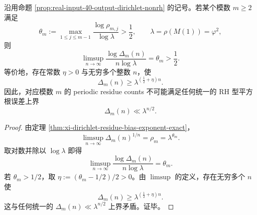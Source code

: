 \begin{corollary}\label{cor:xi-dirichlet-residue-rh-failure-strict-exponential}
沿用命题 \ref{prop:real-input-40-output-dirichlet-nonrh} 的记号。若某个模数 \(m\ge 2\) 满足
\[
\theta_m:=\max_{1\le j\le m-1}\frac{\log\rho_{m,j}}{\log\lambda}>\frac12,
\qquad
\lambda=\rho(M(1))=\varphi^2,
\]
则
\[
\limsup_{n\to\infty}\frac{\log \Delta_m(n)}{n\log\lambda}
=
\theta_m
>
\frac12.
\]
等价地，存在常数 \(\eta>0\) 与无穷多个整数 \(n\)，使
\[
\Delta_m(n)\ge \lambda^{(\frac12+\eta)n}.
\]
因此，对应模数 \(m\) 的 periodic residue counts 不可能满足任何统一的 RH 型平方根误差上界
\[
\Delta_m(n)\ll \lambda^{n/2}.
\]
\end{corollary}
\begin{proof}
由定理 \ref{thm:xi-dirichlet-residue-bias-exponent-exact}，
\[
\limsup_{n\to\infty}\Delta_m(n)^{1/n}
=
\rho_m
=
\lambda^{\theta_m}.
\]
取对数并除以 \(\log\lambda\) 即得
\[
\limsup_{n\to\infty}\frac{\log \Delta_m(n)}{n\log\lambda}
=
\theta_m.
\]
若 \(\theta_m>1/2\)，取 \(\eta:=(\theta_m-1/2)/2>0\)。由 \(\limsup\) 的定义，存在无穷多个 \(n\) 使
\[
\Delta_m(n)\ge \lambda^{(\frac12+\eta)n}.
\]
这与任何统一的 \(\Delta_m(n)\ll \lambda^{n/2}\) 上界矛盾。证毕。
\end{proof}

